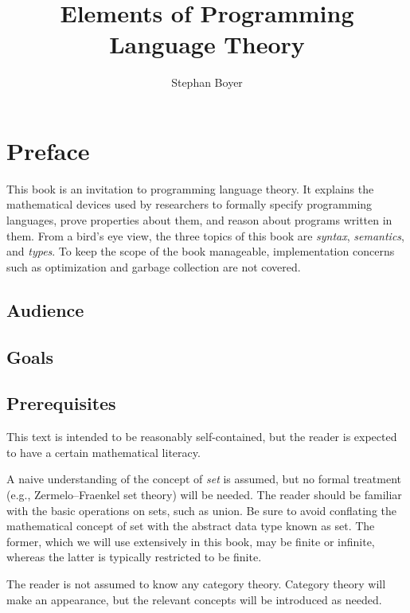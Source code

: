 \documentclass[oneside]{book}
\title{Elements of Programming Language Theory}
\author{Stephan Boyer}
\date{}
\begin{document}
  

  \frontmatter

  \maketitle

  \tableofcontents

  \chapter{Preface}

    This book is an invitation to programming language theory. It explains the mathematical devices used by researchers to formally specify programming languages, prove properties about them, and reason about programs written in them. From a bird's eye view, the three topics of this book are \emph{syntax}, \emph{semantics}, and \emph{types}. To keep the scope of the book manageable, implementation concerns such as optimization and garbage collection are not covered.

    \section*{Audience}

    \section*{Goals}

    \section*{Prerequisites}

      This text is intended to be reasonably self-contained, but the reader is expected to have a certain mathematical literacy.

      A naive understanding of the concept of \emph{set} is assumed, but no formal treatment (e.g., Zermelo--Fraenkel set theory) will be needed. The reader should be familiar with the basic operations on sets, such as union. Be sure to avoid conflating the mathematical concept of set with the abstract data type known as set. The former, which we will use extensively in this book, may be finite or infinite, whereas the latter is typically restricted to be finite.

      The reader is not assumed to know any category theory. Category theory will make an appearance, but the relevant concepts will be introduced as needed.
\end{document}
